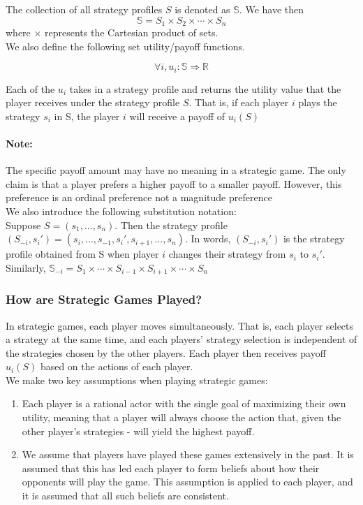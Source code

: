 \documentclass[12pt]{article}
\newcommand{\Note}{\paragraph{Note:}}
\begin{document}
	The collection of all strategy profiles $S$ is denoted as $\mathbb{S}$. We have then 
	\begin{equation*}
	\mathbb{S} = S_1 \times S_2 \times \cdots \times S_n
	\end{equation*} where $\times$ represents the Cartesian product of sets.\\
	
	We also define the following set utility/payoff functions.
	
	\begin{equation*}
	\forall i, u_i : \mathbb{S} \Rightarrow \mathbb{R}
	\end{equation*}
	
	Each of the $u_i$ takes in a strategy profile and returns the utility value that the player receives under the strategy profile $S$. That is, if each player $i$ plays the strategy $s_i$ in S, the player $i$ will receive a payoff of $u_i(S)$
	
	\Note The specific payoff amount may have no meaning in a strategic game. The only claim is that a player prefers a higher payoff to a smaller payoff. However, this preference is an ordinal preference not a magnitude preference\\
	
	We also introduce the following substitution notation:\\
	
	Suppose $S = (s_1,...,s_n)$. Then the strategy profile $(S_{-i},s_i') = (s_i,...,s_{-1},s_i',s_{i+1},...,s_n)$. In words, $(S_{-i},s_i')$ is the strategy profile obtained from S when player $i$ changes their strategy from $s_i$ to $s_i'$. 	Similarly, $\mathbb{S}_{-i} = S_{1} \times \cdots \times S_{i-1} \times S_{i+1} \times \cdots \times S_{n}$
	\subsubsection{How are Strategic Games Played?}
	In strategic games, each player moves simultaneously. That is, each player selects a strategy at the same time, and each players' strategy selection is independent of the strategies chosen by the other players. Each player then receives payoff $u_i(S)$ based on the actions of each player.\\
	
	We make two key assumptions when playing strategic games:
	\begin{enumerate}
		\item Each player is a rational actor with the single goal of maximizing their own utility, meaning that a player will always choose the action that, given the other player's strategies - will yield the highest payoff.\\
		
		\item We assume that players have played these games extensively in the past. It is assumed that this has led each player to form beliefs about how their opponents will play the game. This assumption is applied to each player, and it is assumed that all such beliefs are consistent.
	\end{enumerate}
	
\end{document}

